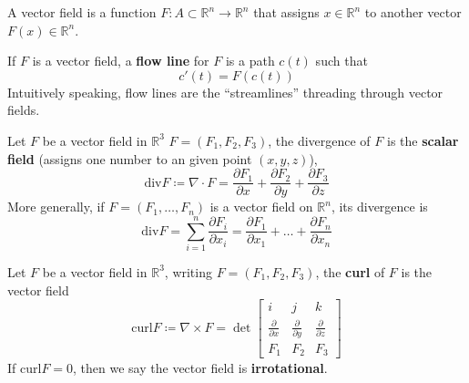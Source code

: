 \documentclass[openany]{book}
\newcommand{\curl}{\text{curl}}
\newcommand{\diverg}{\text{div}}
\newcommand{\R}{\mathbb{R}}
\begin{document}
\begin{defn}
    A vector field is a function $F:A\subset\R^n\to\R^n$ that assigns $x\in\R^n$ to another vector $F(x)\in\R^n$.
\end{defn}


\begin{defn}
    If $F$ is a vector field, a \textbf{flow line} for $F$ is a path $c(t)$ such that 
    \begin{equation*}
        c'(t)=F(c(t))
    \end{equation*}
    Intuitively speaking, flow lines are the ``streamlines'' threading through vector fields.
\end{defn}



\begin{defn}[divergence]
    Let ${F}$ be a vector field in $\R^3$ $F=(F_1,F_2,F_3)$, the divergence of ${F}$ is the \textbf{scalar field} (assigns one number to an given point $(x, y, z)$), 
    \begin{equation*}
        \diverg F\coloneq\nabla\cdot F=\frac{\partial F_1}{\partial x}+\frac{\partial F_2}{\partial y}+\frac{\partial F_3}{\partial z}
    \end{equation*}
    More generally, if $F=(F_1,\dots, F_n)$ is a vector field on $\R^n$, its divergence is 
    \begin{equation*}
        \diverg F=\sum_{i=1}^n\frac{\partial F_i}{\partial x_i}=\frac{\partial F_1}{\partial x_1}+\dots+\frac{\partial F_n}{\partial x_n}
    \end{equation*}
\end{defn}


\begin{defn}[curl]
    Let $F$ be a vector field in $\R^3$, writing $F=(F_1,F_2,F_3)$, the \textbf{curl} of $F$ is the vector field 
    \begin{equation*}
        \curl F\coloneq\nabla\times F=\det\begin{bmatrix}
            i&j&k\\
            \frac{\partial}{\partial x}&\frac{\partial}{\partial y}&\frac{\partial}{\partial z}\\
            F_1&F_2&F_3
        \end{bmatrix}
    \end{equation*}
    If $\curl F=0$, then we say the vector field is \textbf{irrotational}.
\end{defn}
\end{document}
